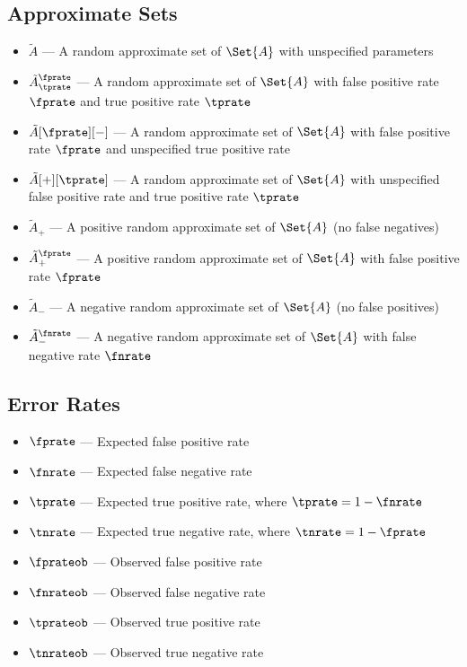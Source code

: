 \subsection{Approximate Sets}
\begin{itemize}
  \item $\tilde{A}$ --- A random approximate set of $\Set{A}$ with unspecified parameters
  \item $\tilde{A}^\fprate_\tprate$ --- A random approximate set of $\Set{A}$ with false positive rate $\fprate$ and true positive rate $\tprate$
  \item $\tilde{A}[\fprate][-]$ --- A random approximate set of $\Set{A}$ with false positive rate $\fprate$ and unspecified true positive rate
  \item $\tilde{A}[+][\tprate]$ --- A random approximate set of $\Set{A}$ with unspecified false positive rate and true positive rate $\tprate$
  \item $\tilde{A}_+$ --- A positive random approximate set of $\Set{A}$ (no false negatives)
  \item $\tilde{A}_+^\fprate$ --- A positive random approximate set of $\Set{A}$ with false positive rate $\fprate$
  \item $\tilde{A}_-$ --- A negative random approximate set of $\Set{A}$ (no false positives)
  \item $\tilde{A}_-^\fnrate$ --- A negative random approximate set of $\Set{A}$ with false negative rate $\fnrate$
\end{itemize}

\subsection{Error Rates}
\begin{itemize}
  \item $\fprate$ --- Expected false positive rate
  \item $\fnrate$ --- Expected false negative rate
  \item $\tprate$ --- Expected true positive rate, where $\tprate = 1 - \fnrate$
  \item $\tnrate$ --- Expected true negative rate, where $\tnrate = 1 - \fprate$
  \item $\fprateob$ --- Observed false positive rate
  \item $\fnrateob$ --- Observed false negative rate
  \item $\tprateob$ --- Observed true positive rate
  \item $\tnrateob$ --- Observed true negative rate
\end{itemize}

